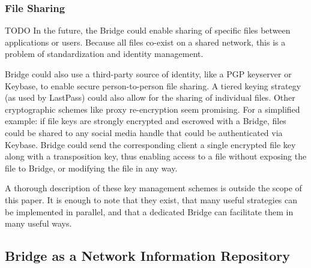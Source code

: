 \documentclass[a4paper,10pt]{article}
\newcommand{\todo}[1]{{\color{red} TODO #1}}
\begin{document}
\subsubsection{File Sharing}

\todo{
In the future, the Bridge could enable sharing of specific files between
applications or users. Because all files co-exist on a shared network, this is a
problem of standardization and identity management.

Bridge could also use a third-party source of identity, like a PGP keyserver or
Keybase\cite{29}, to enable secure person-to-person file sharing. A tiered
keying strategy (as used by LastPass\cite{28}) could also allow for the sharing
of individual files. Other cryptographic schemes like proxy re-encryption seem
promising. For a simplified example: if file keys are strongly encrypted and
escrowed with a Bridge, files could be shared to any social media handle that
could be authenticated via Keybase. Bridge could send the corresponding client a
single encrypted file key along with a transposition key, thus enabling access
to a file without exposing the file to Bridge, or modifying the file in any way.

A thorough description of these key management schemes is outside the scope of
this paper. It is enough to note that they exist, that many useful strategies
can be implemented in parallel, and that a dedicated Bridge can facilitate them
in many useful ways.
}

\subsection{Bridge as a Network Information Repository}
\end{document}
